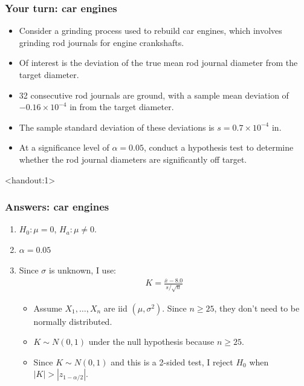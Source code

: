 \documentclass[handout]{beamer}\usepackage{graphicx, color}
\newcommand{\answers}{1}
\providecommand{\ov}[1]{\overline{#1}}
\numberwithin{equation}{section}
\begin{document}
\begin{frame}
\frametitle{Your turn: car engines}
\begin{itemize}
\item Consider a grinding process used to rebuild car engines, which involves grinding rod journals for engine crankshafts. 
\pause \item Of interest is the deviation of the true mean rod journal diameter from the target diameter.
\pause \item 32 consecutive rod journals are ground, with a sample mean deviation of $-0.16 \times 10^{-4}$ in from the target diameter.
\pause \item The sample standard deviation of these deviations is $s = 0.7 \times 10^{-4}$ in.
\pause \item At a significance level of $\alpha = 0.05$, conduct a hypothesis test to determine whether the rod journal diameters are significantly off target.
\end{itemize}
\end{frame}



\begin{frame}<handout:\answers>
\frametitle{Answers: car engines}
\begin{enumerate}[1. ]
\item  $H_0: \mu = 0$, $H_a: \mu \ne 0$. 
\pause \item $\alpha = 0.05$
\pause \item Since $\sigma$ is unknown, I use:
\begin{align*}
K = \frac{\ov{x} - 8.0}{s/\sqrt{n}}
\end{align*}
\begin{itemize}
\pause \item Assume $X_1, \ldots, X_n$ are iid $(\mu, \sigma^2)$. Since $n \ge 25$, they don't need to be normally distributed.
\pause \item $K \sim N(0,1)$ under the null hypothesis because $n \ge 25$.
\pause \item Since $K \sim N(0,1)$ and this is a 2-sided test, I reject $H_0$ when $|K| > |z_{1-\alpha/2}|$.
\end{itemize}
\end{enumerate}
\end{frame}
\end{document}
